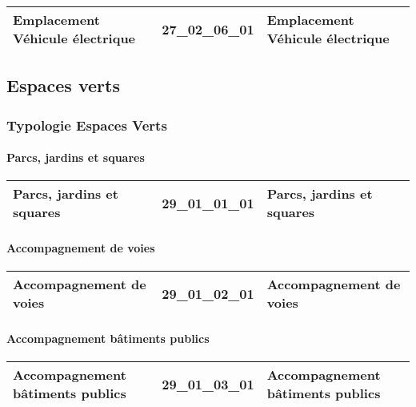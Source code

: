 \documentclass[12pt,titlepage,oneside]{book}
\begin{document}
\renewcommand{\arraystretch}{1.2}
\begin{supertabular}{|p{10cm}|c|p{15cm}|}
 Emplacement Véhicule électrique & 27\_02\_06\_01 & Emplacement Véhicule électrique\\
\hline
\end{supertabular}
\subsection{Espaces verts}
\subsubsection{\large Typologie Espaces Verts}
\paragraph{Parcs, jardins et squares}
\noindent
\vspace{\baselineskip}

\renewcommand{\arraystretch}{1.2}
\begin{supertabular}{|p{10cm}|c|p{15cm}|}
 Parcs, jardins et squares & 29\_01\_01\_01 & Parcs, jardins et squares\\
\hline
\end{supertabular}


\paragraph{Accompagnement de voies}
\noindent
\vspace{\baselineskip}

\renewcommand{\arraystretch}{1.2}
\begin{supertabular}{|p{10cm}|c|p{15cm}|}
 Accompagnement de voies & 29\_01\_02\_01 & Accompagnement de voies\\
\hline
\end{supertabular}


\paragraph{Accompagnement bâtiments publics}
\noindent
\vspace{\baselineskip}

\renewcommand{\arraystretch}{1.2}
\begin{supertabular}{|p{10cm}|c|p{15cm}|}
 Accompagnement bâtiments publics & 29\_01\_03\_01 & Accompagnement bâtiments publics\\
\hline
\end{supertabular}
\end{document}
